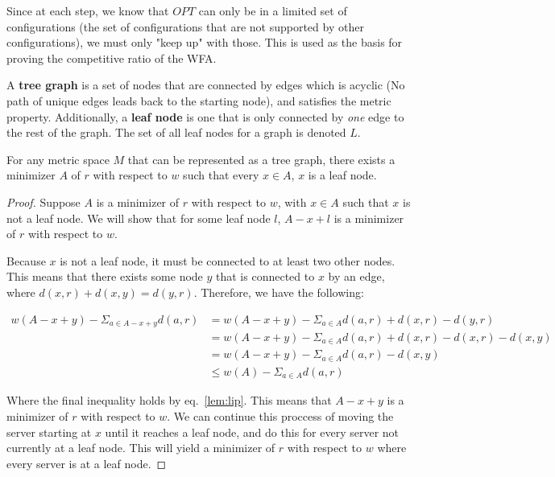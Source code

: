 Since at each step, we know that $OPT$ can only be in a limited set of configurations (the set of configurations that are not supported by other configurations), we must only "keep up" with those. This is used as the basis for proving the competitive ratio of the WFA.

\begin{definition}
    A \textbf{tree graph} is a set of nodes that are connected by edges which is acyclic (No path of unique edges leads back to the starting node), and satisfies the metric property. Additionally, a \textbf{leaf node} is one that is only connected by \textit{one} edge to the rest of the graph. The set of all leaf nodes for a graph is denoted $L$.
\end{definition}

\begin{lemma}
    \label{lem:leaf}
    For any metric space $M$ that can be represented as a tree graph, there exists a minimizer $A$ of $r$ with respect to $w$ such that every $x \in A$, $x$ is a leaf node.
\end{lemma}

\begin{proof}
    Suppose $A$ is a minimizer of $r$ with respect to $w$, with $x \in A$ such that $x$ is not a leaf node. We will show that for some leaf node $l$, $A-x+l$ is a minimizer of $r$ with respect to $w$. 

    Because $x$ is not a leaf node, it must be connected to at least two other nodes. This means that there exists some node $y$ that is connected to $x$ by an edge, where $d(x,r) + d(x,y) = d(y,r)$. Therefore, we have the following:

    \begin{equation*}
        \begin{split}
            w(A-x+y) - \Sigma_{a \in A-x+y} d(a,r) &= w(A-x+y) - \Sigma_{a \in A} d(a,r) + d(x,r) - d(y,r) \\
            &= w(A-x+y) - \Sigma_{a \in A} d(a,r) + d(x,r) - d(x,r) - d(x,y)\\
            &= w(A-x+y) - \Sigma_{a \in A} d(a,r) - d(x,y) \\
            &\leq w(A) - \Sigma_{a \in A} d(a,r)
        \end{split}
    \end{equation*}

    Where the final inequality holds by eq.~\ref{lem:lip}. This means that $A-x+y$ is a minimizer of $r$ with respect to $w$. We can continue this proccess of moving the server starting at $x$ until it reaches a leaf node, and do this for every server not currently at a leaf node. This will yield a minimizer of $r$ with respect to $w$ where every server is at a leaf node.
\end{proof}